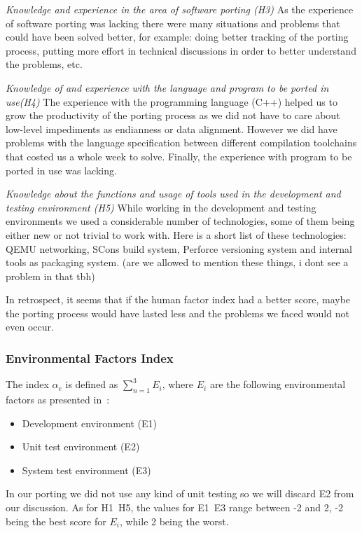 \textit{Knowledge and experience in the area of software porting (H3)}
As the experience of software porting was lacking there were many situations
and problems that could have been solved better, for example: doing better
tracking of the porting process, putting more effort in technical discussions
in order to better understand the problems, etc.

\textit{Knowledge of and experience with the language and program to be ported
in use(H4)}
The experience with the programming language (C++) helped us to grow the
productivity of the porting process as we did not have to care about low-level
impediments as endianness or data alignment. However we did have problems with
the language specification between different compilation toolchains that costed
us a whole week to solve. Finally, the experience with program to be ported in
use was lacking.

\textit{Knowledge about the functions and usage of tools used in the development
and testing environment (H5)}
While working in the development and testing environments we used a considerable
number of technologies, some of them being either new or not trivial to work
with. Here is a short list of these technologies: QEMU networking, SCons build
system, Perforce versioning system and internal tools as packaging system. (are
we allowed to mention these things, i dont see a problem in that tbh)

In retrospect, it seems that if the human factor index had a better score, maybe
the porting process would have lasted less and the problems we faced would not
even occur.

\subsubsection{Environmental Factors Index}

The index $\alpha_e$ is defined as $\sum_{n=1}^{3} E_i$, where $E_i$ are the
following environmental factors as presented in~\cite{b2}:
\begin{itemize}
    \item Development environment (E1)
    \item Unit test environment (E2)
    \item System test environment (E3)
\end{itemize}

In our porting we did not use any kind of unit testing so we will discard E2
from our discussion. As for H1~H5, the values for E1~E3 range between -2 and 2,
-2 being the best score for $E_i$, while 2 being the worst.

